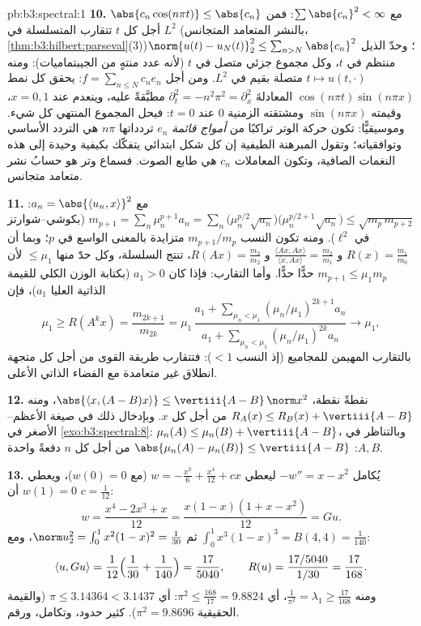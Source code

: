 \begin{solution}{pb:b3:spectral:1}
\textbf{10.} $\abs{c_n\cos(n\pi t)} \leq \abs{c_n}$ مع $\sum\abs{c_n}^2 < \infty$: فمن أجل كل $t$ تتقارب
المتسلسلة في $L^2$ (بالنشر المتعامد المتجانس،
\cref{thm:b3:hilbert:parseval}(3))؛ وحدّ الذيل $\norm{u(t) - u_N(t)}_2^2 \leq \sum_{n>N}\abs{c_n}^2$ منتظم في $t$، وكل مجموع
جزئي متصل في $t$ (لأنه عدد منتهٍ من الجيبتماميات): ومنه $t \mapsto u(t,\cdot)$
متصلة بقيم في $L^2$. ومن أجل $f = \sum_{n\leq N}c_ne_n$: يحقق كل نمط $\cos(n\pi t)\sin(n\pi x)$
المعادلةَ $\partial_t^2 =
-n^2\pi^2 = \partial_x^2$ مطبَّقةً عليه، وينعدم عند $x = 0,
1$، وقيمته
$\sin(n\pi x)$ ومشتقته الزمنية $0$ عند $t =
0$: فيحل المجموع
المنتهي كل شيء. وموسيقيًّا: تكون حركة الوتر تراكبًا من \emph{أمواج
قائمة} $e_n$ تردداتها $n\pi$ هي التردد الأساسي وتوافقياته؛
وتقول المبرهنة الطيفية إن كل شكل ابتدائي يتفكّك بكيفية وحيدة
إلى هذه النغمات الصافية، وتكون المعاملات $c_n$ هي طابع الصوت.
فسماع وتر هو حسابُ نشر متعامد متجانس.

\textbf{11.} مع $a_n = \abs{\langle u_n, x\rangle}^2$: $m_{p+1} = \sum_n\mu_n^{p+1}a_n = \sum_n\bigl(\mu_n^{p/2}
\sqrt{a_n}\bigr)\bigl(\mu_n^{p/2+1}\sqrt{a_n}\bigr) \leq
\sqrt{m_p\,m_{p+2}}$ (بكوشي--شوارتز في $\ell^2$).
ومنه تكون النسب $m_{p+1}/m_p$ متزايدة بالمعنى الواسع في $p$؛
وبما أن $R(x) = \frac{m_1}{m_0}$ و $\frac{\langle Ax, Ax\rangle}
{\langle x, Ax\rangle} = \frac{m_2}{m_1}$ و $R(Ax) =
\frac{m_3}{m_2}$، تنتج السلسلة، وكل حدّ منها
$\leq \mu_1$ لأن $m_{p+1} \leq \mu_1m_p$ حدًّا حدًّا. وأما التقارب: فإذا كان
$a_1 > 0$ (بكتابة الوزن الكلي للقيمة الذاتية العليا $a_1$)،
فإن
\[
\mu_1 \geq R(A^kx) = \frac{m_{2k+1}}{m_{2k}} =
\mu_1\,\frac{a_1 + \sum_{\mu_n<\mu_1}(\mu_n/\mu_1)^{2k+1}
a_n}{a_1 + \sum_{\mu_n<\mu_1}(\mu_n/\mu_1)^{2k}a_n}
\longrightarrow \mu_1,
\]
بالتقارب المهيمن للمجاميع (إذ النسب $< 1$): فتتقارب طريقة القوى
من أجل كل متجهة انطلاق غير متعامدة مع الفضاء الذاتي الأعلى.

\textbf{12.} نقطةً نقطة، $\abs{\langle x, (A - B)x\rangle}
\leq \vertiii{A - B}\,\norm x^2$، ومنه $R_A(x) \leq R_B(x) +
\vertiii{A - B}$ من أجل كل $x$.
وبإدخال ذلك في صيغة الأعظم--الأصغر في \cref{exo:b3:spectral:8}: $\mu_n(A)
\leq \mu_n(B) + \vertiii{A - B}$،
وبالتناظر في $A,
B$: $\abs{\mu_n(A) - \mu_n(B)} \leq \vertiii{A - B}$ من أجل كل $n$ دفعةً واحدة.

\textbf{13.} يُكامل $-w'' = x - x^2$ ليعطي $w = -\frac{x^3}6
+ \frac{x^4}{12} + cx$ (مع
$w(0) = 0$)، ويعطي $w(1) = 0$ أن $c = \frac1{12}$:
\[
w = \frac{x^4 - 2x^3 + x}{12} = \frac{x(1-x)(1 + x -
x^2)}{12} = Gu .
\]
ثم $\norm u_2^2 = \int_0^1x^2(1-x)^2 = \frac1{30}$، ومع $\int_0^1x^3(1-x)^3 = B(4,4) = \frac1{140}$:
\[
\langle u, Gu\rangle = \frac1{12}\Bigl(\frac1{30} +
\frac1{140}\Bigr) = \frac{17}{5040},
\qquad
R(u) = \frac{17/5040}{1/30} = \frac{17}{168} .
\]
ومنه $\frac1{\pi^2} = \lambda_1 \geq \frac{17}{168}$، أي $\pi^2 \leq \frac{168}{17} = 9.8824$: أي $\pi \leq 3.14364 <
3.1437$ (والقيمة الحقيقية
$\pi^2 = 9.8696$). كثير حدود، وتكامل، ورقم.


\end{solution}
